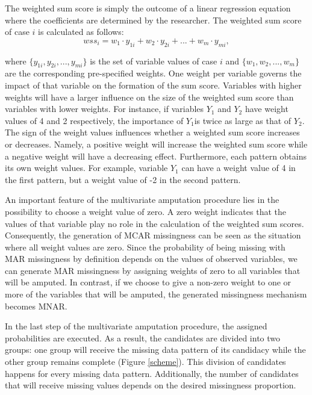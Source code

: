 \documentclass[11pt,a4paper]{article}
\begin{document}
The weighted sum score is simply the outcome of a linear regression equation where the coefficients are determined by the researcher. The weighted sum score of case $i$ is calculated as follows:
\vspace{-5mm}
\begin{equation*}
wss_i = w_1 \cdot y_{1i} + w_2 \cdot y_{2i} + ... + w_m \cdot y_{mi},
\end{equation*}

\noindent where $\{y_{1i}, y_{2i}, ..., y_{mi}\}$ is the set of variable values of case $i$ and $\{w_1, w_2, ..., w_m\}$ are the corresponding pre-specified weights. One weight per variable governs the impact of that variable on the formation of the sum score. Variables with higher weights will have a larger influence on the size of the weighted sum score than variables with lower weights. For instance, if variables $Y_1$ and $Y_2$ have weight values of 4 and 2 respectively, the importance of $Y_1$is twice as large as that of $Y_2$. The sign of the weight values influences whether a weighted sum score increases or decreases. Namely, a positive weight will increase the weighted sum score while a negative weight will have a decreasing effect. Furthermore, each pattern obtains its own weight values. For example, variable $Y_1$ can have a weight value of 4 in the first pattern, but a weight value of -2 in the second pattern. 

An important feature of the multivariate amputation procedure lies in the possibility to choose a weight value of zero. A zero weight indicates that the values of that variable play no role in the calculation of the weighted sum scores. Consequently, the generation of MCAR missingness can be seen as the situation where all weight values are zero. Since the probability of being missing with MAR missingness by definition depends on the values of observed variables, we can generate MAR missingness by assigning weights of zero to all variables that will be amputed. In contrast, if we choose to give a non-zero weight to one or more of the variables that will be amputed, the generated missingness mechanism becomes MNAR.  

In the last step of the multivariate amputation procedure, the assigned probabilities are executed. As a result, the candidates are divided into two groups: one group will receive the missing data pattern of its candidacy while the other group remains complete (Figure \ref{scheme}). This division of candidates happens for every missing data pattern. Additionally, the number of candidates that will receive missing values depends on the desired missingness proportion. 
\end{document}
